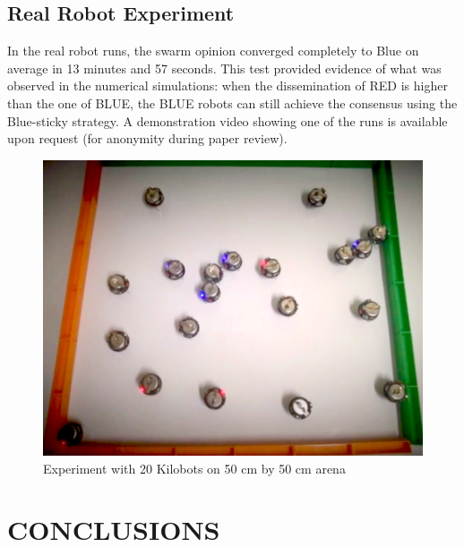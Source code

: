 \documentclass[sigconf]{acmart}
\begin{document}
\subsection{Real Robot Experiment}
In the real robot runs, the swarm opinion converged completely to Blue on average in 13 minutes and 57 seconds. This test provided evidence of what was observed in the numerical simulations: when the dissemination of RED is higher than the one of BLUE, the BLUE robots can still achieve the consensus using the Blue-sticky strategy. A demonstration video showing one of the runs is available upon request (for anonymity during paper review).


   \begin{figure}[t]
      \centering
      \includegraphics[scale=0.17]{images/Photo-Kilobots-Experiment.png}
      \caption{Experiment with 20 Kilobots on 50 cm by 50 cm arena}
      \label{fig:kilobots}
   \end{figure}
   
\section{CONCLUSIONS}
\label{sec:conclusions}
\end{document}
